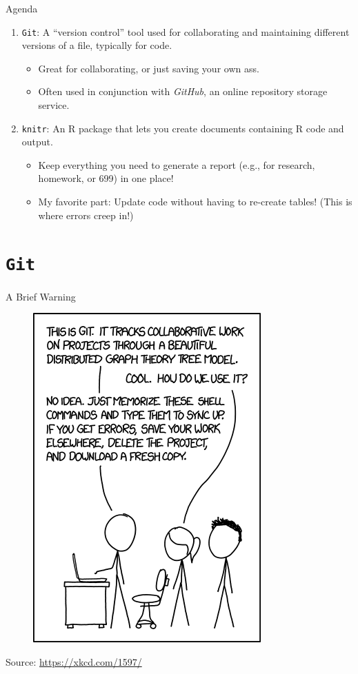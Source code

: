 \documentclass{beamer}
\begin{document}
	\begin{frame}{Agenda}
		\begin{enumerate}
			\item \texttt{Git}: A ``version control'' tool used for collaborating and maintaining different versions of a file, typically for code.
			\begin{itemize}
				\item Great for collaborating, or just saving your own ass.
				\item Often used in conjunction with \textit{GitHub}, an online repository storage service. \\
			\end{itemize}
			\item \texttt{knitr}: An R package that lets you create documents containing R code and output.
			\begin{itemize}
				\item Keep everything you need to generate a report (e.g., for research, homework, or 699) in one place!
				\item My favorite part: Update code without having to re-create tables! (This is where errors creep in!)
			\end{itemize}
		\end{enumerate}
	\end{frame}
	
	\section{\texttt{Git}}
	
	\begin{frame}{A Brief Warning}
		\begin{figure}
			\centering
			\includegraphics[height=.75\textheight]{xkcd-git.png}
		\end{figure}
		\scriptsize{Source: \url{https://xkcd.com/1597/}}
	\end{frame}
	
\end{document}
